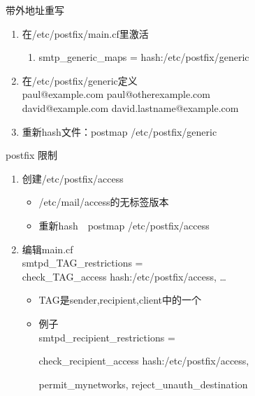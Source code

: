 \begin{frame}{带外地址重写}
\begin{enumerate}
\item 在/etc/postfix/main.cf里激活

\begin{enumerate}
\item smtp\_generic\_maps = hash:/etc/postfix/generic
\end{enumerate}
\item 在/etc/postfix/generic定义\\
paul@example.com paul@otherexample.com\\
david@example.com david.lastname@example.com
\item 重新hash文件：postmap /etc/postfix/generic
\end{enumerate}

\end{frame} 
\begin{frame}{postfix 限制}
\begin{enumerate}
\item 创建/etc/postfix/access

\begin{itemize}
\item /etc/mail/access的无标签版本
\item 重新hash　postmap /etc/postfix/access
\end{itemize}
\item 编辑main.cf\\
smtpd\_TAG\_restrictions =\\
check\_TAG\_access hash:/etc/postfix/access, \ldots{}

\begin{itemize}
\item TAG是sender,recipient,client中的一个
\item 例子\\
smtpd\_recipient\_restrictions =


check\_recipient\_access hash:/etc/postfix/access,


permit\_mynetworks, reject\_unauth\_destination

\end{itemize}
\end{enumerate}

\end{frame} 
